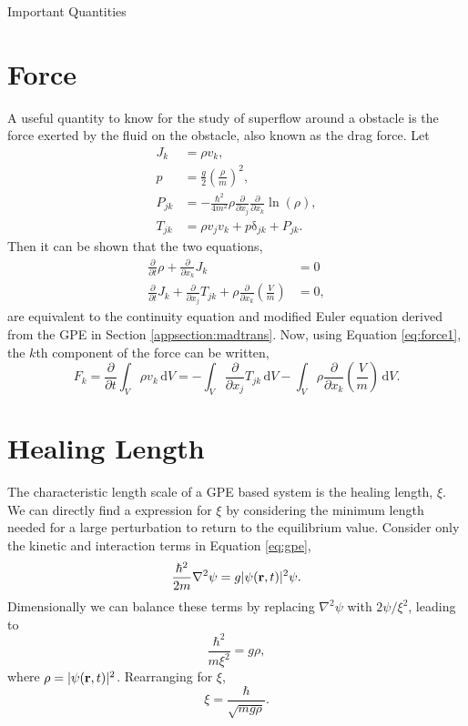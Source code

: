 \begin{chapter}{Important Quantities\label{app:ImpQuantities}}
\section{\label{appsection:force} Force}
A useful quantity to know for the study of superflow around a obstacle is the force exerted by the fluid on the obstacle, also known as the drag force. Let 
\begin{align*}
J_k &= \rho v_k,\\
p &= \frac{g}{2}\left(\frac{\rho}{m}\right)^2,\\
P_{jk} &= -\frac{\hbar^2}{4m^2} \rho \frac{\partial}{\partial x_j} \frac{\partial}{\partial x_k} \ln(\rho),\\
T_{jk} &= \rho v_j v_k + p\mathrm{\delta}_{jk} + P_{jk}.
\end{align*}
Then it can be shown that the two equations,
\begin{align}
\frac{\partial}{\partial t}\rho + \frac{\partial}{\partial x_k}J_k &= 0 \\
\frac{\partial}{\partial t}J_k + \frac{\partial}{\partial x_j}T_{jk} + \rho \frac{\partial}{\partial x_k} \left( \frac{V}{m}\right) &= 0,\label{eq:force1}
\end{align}
are equivalent to the continuity equation and modified Euler equation derived from the GPE in Section \ref{appsection:madtrans}. Now, using Equation \ref{eq:force1}, the $k$th component of the force can be written,
\begin{equation}
F_k =\frac{\partial}{\partial t} \int_V \rho v_k\,\mathrm{d}V = - \int_V \frac{\partial}{\partial x_j} T_{jk}\,\mathrm{d}V - \int_V \rho \frac{\partial}{\partial x_k} \left( \frac{V}{m} \right)\,\mathrm{d}V.
\label{eq:force}
\end{equation}

\section{\label{section:healing} Healing Length}
The characteristic length scale of a GPE based system is the healing length, $\xi$. We can directly find a expression for $\xi$ by considering the minimum length needed for a large perturbation to return to the equilibrium value. Consider only the kinetic and interaction terms in Equation \ref{eq:gpe},
\begin{equation}
  \frac{\hbar^2}{2m}\nabla^2\psi = g|\psi({\bf r},t)|^2\psi.
\end{equation}
Dimensionally we can balance these terms by replacing $\nabla^2\psi$ with $2\psi/\xi^2$, leading to
\begin{equation}
  \frac{\hbar^2}{m\xi^2} = g\rho,
\end{equation}
where $\rho = |\psi({\bf r},t)|^2$. Rearranging for $\xi$,
\begin{equation}
  \xi = \frac{\hbar}{\sqrt{mg\rho}}.
\end{equation}
\end{chapter}


